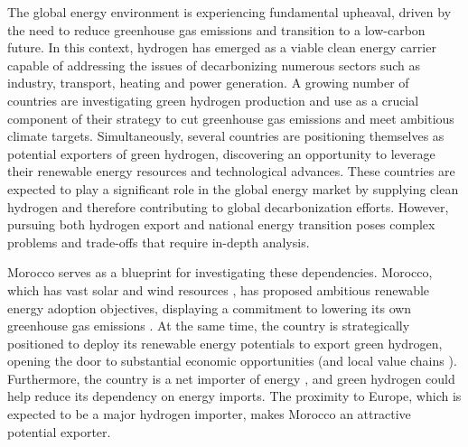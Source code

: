






The global energy environment is experiencing fundamental upheaval, driven by the need to reduce greenhouse gas emissions and transition to a low-carbon future. In this context, hydrogen has emerged as a viable clean energy carrier capable of addressing the issues of decarbonizing numerous sectors such as industry, transport, heating and power generation. A growing number of countries are investigating green hydrogen production and use as a crucial component of their strategy to cut greenhouse gas emissions and meet ambitious climate targets.
Simultaneously, several countries are positioning themselves as potential exporters of green hydrogen, discovering an opportunity to leverage their renewable energy resources and technological advances. %
These countries are expected to play a significant role in the global energy market by supplying clean hydrogen and therefore contributing to global decarbonization efforts. However, pursuing both hydrogen export and national energy transition poses complex problems and trade-offs that require in-depth analysis.

Morocco serves as a blueprint for investigating these dependencies. Morocco, which has vast solar and wind resources \cite{Peters2023, Touili2018, Sterl2022}, has proposed ambitious renewable energy adoption objectives, displaying a commitment to lowering its own greenhouse gas emissions \cite{CAT2021}. At the same time, the country is strategically positioned to deploy its renewable energy potentials to export green hydrogen, opening the door to substantial economic opportunities (and local value chains \cite{Ersoy2022}). Furthermore, the country is a net importer of energy \cite{IEA2022}, and green hydrogen could help reduce its dependency on energy imports. The proximity to Europe, which is expected to be a major hydrogen importer, makes Morocco an attractive potential exporter. %

